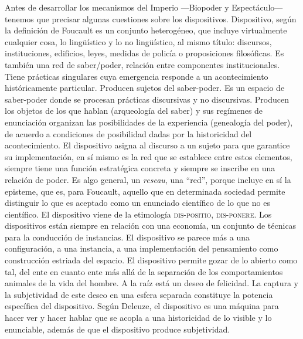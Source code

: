 Antes de desarrollar los mecanismos del Imperio ---Biopoder y Espectáculo--- tenemos que precisar algunas cuestiones sobre los dispositivos. Dispositivo, según la definición de Foucault es un conjunto heterogéneo, que incluye virtualmente cualquier cosa, lo lingüístico y lo no lingüístico, al mismo título: discursos, instituciones, edificios, leyes, medidas de policía o proposiciones filosóficas. Es también una red de saber/poder, relación entre componentes institucionales. Tiene prácticas singulares cuya emergencia responde a un acontecimiento históricamente particular. Producen sujetos del saber-poder. Es un espacio de saber-poder donde se procesan prácticas discursivas y no discursivas. Producen los objetos de los que hablan (arqueología del saber) y sus regímenes de enunciación organizan las posibilidades de la experiencia (genealogía del poder), de acuerdo a condiciones de posibilidad dadas por la historicidad del acontecimiento. El dispositivo asigna al discurso a un sujeto para que garantice su implementación, en sí mismo es la red que se establece entre estos elementos, siempre tiene una función estratégica concreta y siempre se inscribe en una relación de poder. Es algo general, un \emph{reseau}, una \enquote{red}, porque incluye en sí la episteme, que es, para Foucault, aquello que en determinada sociedad permite distinguir lo que es aceptado como un enunciado científico de lo que no es científico. El dispositivo viene de la etimología \textsc{dis-positio}, \textsc{dis-ponere}. Los dispositivos están siempre en relación con una economía, un conjunto de técnicas para la conducción de instancias. El dispositivo se parece más a una configuración, a una instancia, a una implementación del pensamiento como construcción estriada del espacio. El dispositivo permite gozar de lo abierto como tal, del ente en cuanto ente más allá de la separación de los comportamientos animales de la vida del hombre. A la raíz está un deseo de felicidad. La captura y la subjetividad de este deseo en una esfera separada constituye la potencia específica del dispositivo. Según Deleuze, el dispositivo es una máquina para hacer ver y hacer hablar que se acopla a una historicidad de lo visible y lo enunciable, además de que el dispositivo produce subjetividad.

